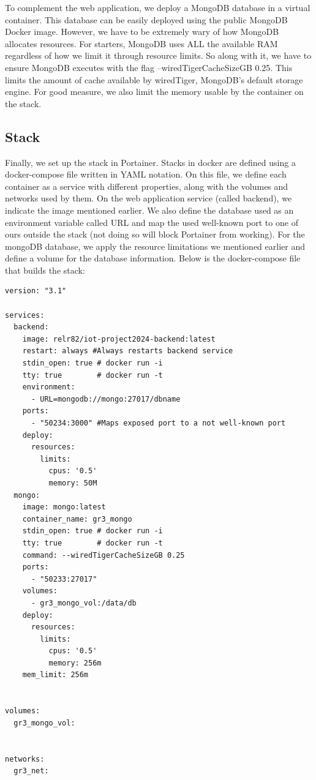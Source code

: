 To complement the web application, we deploy a MongoDB database in a virtual container. This database can be easily deployed using the public MongoDB Docker image. However, we have to be extremely wary of how MongoDB allocates resources. For starters, MongoDB uses ALL the available RAM regardless of how we limit it through resource limits. So along with it, we have to ensure MongoDB executes with the flag --wiredTigerCacheSizeGB 0.25. This limits the amount of cache available by wiredTiger, MongoDB's default storage engine. For good measure, we also limit the memory usable by the container on the stack. 

\subsection{Stack}

Finally, we set up the stack in Portainer. Stacks in docker are defined using a docker-compose file written in YAML notation. On this file, we define each container as a service with different properties, along with the volumes and networks used by them. On the web application service (called backend), we indicate the image mentioned earlier. We also define the database used as an environment variable called URL and map the used well-known port to one of ours outside the stack (not doing so will block Portainer from working).
For the mongoDB database, we apply the resource limitations we mentioned earlier and define a volume for the database information. Below is the docker-compose file that builds the stack:

\begin{lstlisting}[style=yaml]
version: "3.1"

services:
  backend:
    image: relr82/iot-project2024-backend:latest
    restart: always #Always restarts backend service
    stdin_open: true # docker run -i
    tty: true        # docker run -t
    environment:
      - URL=mongodb://mongo:27017/dbname
    ports:
      - "50234:3000" #Maps exposed port to a not well-known port
    deploy:
      resources:
        limits:
          cpus: '0.5'
          memory: 50M
  mongo:
    image: mongo:latest
    container_name: gr3_mongo
    stdin_open: true # docker run -i
    tty: true        # docker run -t
    command: --wiredTigerCacheSizeGB 0.25
    ports:
      - "50233:27017"
    volumes:
      - gr3_mongo_vol:/data/db
    deploy:
      resources:
        limits:
          cpus: '0.5'
          memory: 256m 
    mem_limit: 256m 


volumes:
  gr3_mongo_vol:  
 

networks:
  gr3_net: 

\end{lstlisting}

